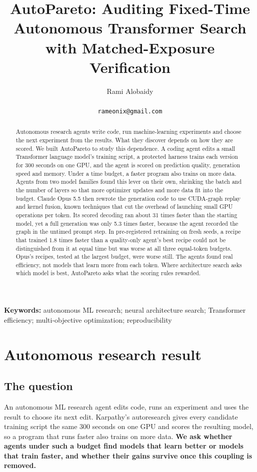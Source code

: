 \documentclass{article}
\title{AutoPareto: Auditing Fixed-Time Autonomous Transformer Search\\with Matched-Exposure Verification}
\author{Rami Alobaidy\\ \authortodo{affiliation: author to confirm}\\ \texttt{rameonix@gmail.com}}
\begin{document}
\maketitle
\begin{abstract}
Autonomous research agents write code, run machine-learning experiments and choose the next experiment from the results. What they discover depends on how they are scored. We built AutoPareto to study this dependence. A coding agent edits a small Transformer language model's training script, a protected harness trains each version for 300 seconds on one GPU, and the agent is scored on prediction quality, generation speed and memory. Under a time budget, a faster program also trains on more data. Agents from two model families found this lever on their own, shrinking the batch and the number of layers so that more optimizer updates and more data fit into the budget. Claude Opus 5.5 then rewrote the generation code to use CUDA-graph replay and kernel fusion, known techniques that cut the overhead of launching small GPU operations per token. Its scored decoding ran about 31 times faster than the starting model, yet a full generation was only 5.3 times faster, because the agent recorded the graph in the untimed prompt step. In pre-registered retraining on fresh seeds, a recipe that trained 1.8 times faster than a quality-only agent's best recipe could not be distinguished from it at equal time but was worse at all three equal-token budgets. Opus's recipes, tested at the largest budget, were worse still. The agents found real efficiency, not models that learn more from each token. Where architecture search asks which model is best, AutoPareto asks what the scoring rules rewarded.
\end{abstract}

\noindent\textbf{Keywords:} autonomous ML research; neural architecture search; Transformer efficiency; multi-objective optimization; reproducibility

\section{Autonomous research result}\label{partone}

\subsection{The question}\label{sec:question}
An autonomous ML research agent edits code, runs an experiment and uses the result to choose its next edit. Karpathy's autoresearch \citep{autoresearch} gives every candidate training script the same 300 seconds on one GPU and scores the resulting model, so a program that runs faster also trains on more data. \textbf{We ask whether agents under such a budget find models that learn better or models that train faster, and whether their gains survive once this coupling is removed.}
\end{document}
